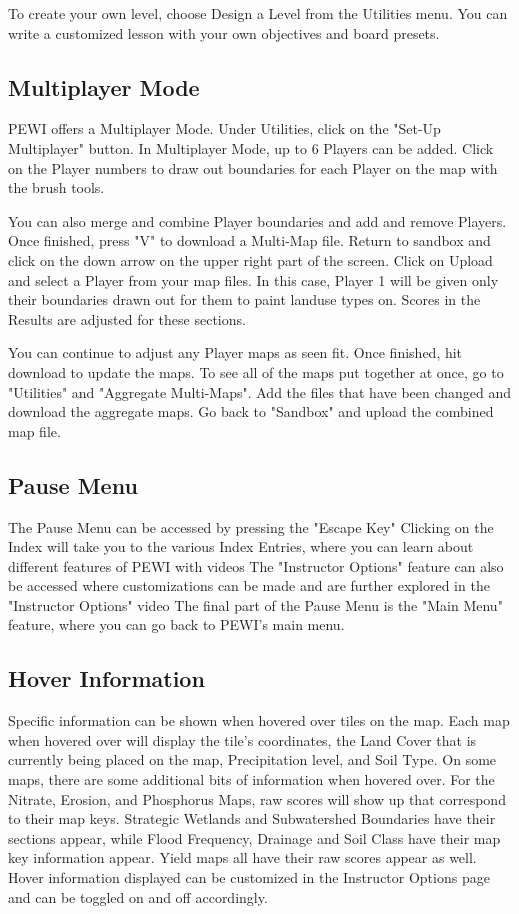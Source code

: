 \documentclass[11pt]{article}
\begin{document}
To create your own level, choose Design a Level from the Utilities menu. You can write a customized lesson with your own objectives and board presets.

\subsection{Multiplayer Mode}
PEWI offers a Multiplayer Mode. Under Utilities, click on the "Set-Up Multiplayer" button. In Multiplayer Mode, up to 6 Players can be added. Click on the Player numbers to draw out boundaries for each Player on the map with the brush tools.

You can also merge and combine Player boundaries and add and remove Players. Once finished, press "V" to download a Multi-Map file. Return to sandbox and click on the down arrow on the upper right part of the screen. Click on Upload and select a Player from your map files. In this case, Player 1 will be given only their boundaries drawn out for them to paint landuse types on. Scores in the Results are adjusted for these sections.

You can continue to adjust any Player maps as seen fit. Once finished, hit download to update the maps. To see all of the maps put together at once, go to "Utilities" and "Aggregate Multi-Maps". Add the files that have been changed and download the aggregate maps. Go back to "Sandbox" and upload the combined map file.

\subsection{Pause Menu}
The Pause Menu can be accessed by pressing the "Escape Key" Clicking on the Index will take you to the various Index Entries, where you can learn about different features of PEWI with videos The "Instructor Options" feature can also be accessed where customizations can be made and are further explored in the "Instructor Options" video The final part of the Pause Menu is the "Main Menu" feature, where you can go back to PEWI's main menu.

\subsection{Hover Information}
Specific information can be shown when hovered over tiles on the map. Each map when hovered over will display the tile's coordinates, the Land Cover that is currently being placed on the map, Precipitation level, and Soil Type. On some maps, there are some additional bits of information when hovered over. For the Nitrate, Erosion, and Phosphorus Maps, raw scores will show up that correspond to their map keys. Strategic Wetlands and Subwatershed Boundaries have their sections appear, while Flood Frequency, Drainage and Soil Class have their map key information appear. Yield maps all have their raw scores appear as well. Hover information displayed can be customized in the Instructor Options page and can be toggled on and off accordingly.  
\end{document}
